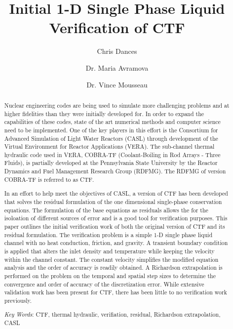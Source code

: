 \documentclass{mc2015}
\begin{document}
\title{Initial 1-D Single Phase Liquid Verification of CTF}

\author{Chris Dances}
\author{Dr. Maria Avramova}

\author{Dr. Vince Mousseau}

\maketitle

\begin{abstract}
Nuclear engineering codes are being used to simulate more challenging problems
and at higher fidelities than they were initially developed for. In order to
expand the capabilities of these codes, state of the art numerical methods and
computer science need to be implemented. One of the key players in this effort
is the Consortium for Advanced Simulation of Light Water Reactors (CASL) through
development of the Virtual Environment for Reactor Applications (VERA). The
sub-channel thermal hydraulic code used in VERA, COBRA-TF (Coolant-Boiling in
Rod Arrays - Three Fluids), is partially developed at the Pennsylvania State
University by the Reactor Dynamics and Fuel Management Research Group (RDFMG).
The RDFMG of version COBRA-TF is referred to as CTF.

In an effort to help meet the objectives of CASL, a version of CTF has been
developed that solves the residual formulation of the one dimensional 
single-phase conservation equations. The formulation of the base equations as
residuals allows the for the isoloation of different sources of error and is a
good tool for verification purposes. This paper outlines the initial
verification work of both the original version of CTF and its residual
formulation. The verification problem is a simple 1-D single phase liquid
channel with no heat conduction, friction, and gravity. A transient boundary
condition is applied that alters the inlet density and temperature while keeping
the velocity within the channel constant. The constant velocity simplifies the modified
equation analysis and the order of accuracy is readily obtained. A Richardson
extrapolation is performed on the problem on the temporal and spatial step sizes
to determine the convergence and order of accuracy of the discretization error.
While extensive validation work has been present for CTF, there has been little
to no verification work previously. 

\emph{Key Words}: CTF, thermal hydraulic, verifiation, residual, Richardson
extrapolation, CASL

\end{abstract}
\end{document}
